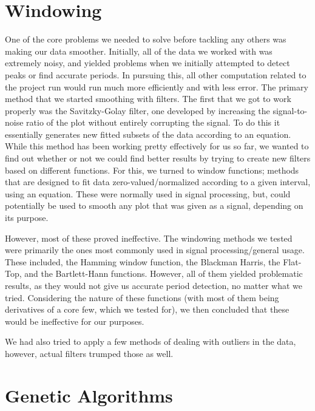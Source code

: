 \documentclass[conference]{IEEEtran}
\begin{document}
\section{Windowing}
One of the core problems we needed to solve before tackling any others was making our data smoother. Initially, all of the data we worked with was extremely noisy, and yielded problems when we initially attempted to detect peaks or find accurate periods. In pursuing this, all other computation related to the project run would run much more efficiently and with less error. The primary method that we started smoothing with filters. The first that we got to work properly was the Savitzky-Golay filter, one developed by increasing the signal-to-noise ratio of the plot without entirely corrupting the signal. To do this it essentially generates new fitted subsets of the data according to an equation. While this method has been working pretty effectively for us so far, we wanted to find out whether or not we could find better results by trying to create new filters based on different functions. For this, we turned to window functions; methods that are designed to fit data zero-valued/normalized according to a given interval, using an equation. These were normally used in signal processing, but, could potentially be used to smooth any plot that was given as a signal, depending on its purpose.

However, most of these proved ineffective. The windowing methods we tested were primarily the ones most commonly used in signal processing/general usage. These included, the Hamming window function, the Blackman Harris, the Flat-Top, and the Bartlett-Hann functions. However, all of them yielded problematic results, as they would not give us accurate period detection, no matter what we tried. Considering the nature of these functions (with most of them being derivatives of a core few, which we tested for), we then concluded that these would be ineffective for our purposes.

We had also tried to apply a few methods of dealing with outliers in the data, however, actual filters trumped those as well. 

\section{Genetic Algorithms}
\end{document}
